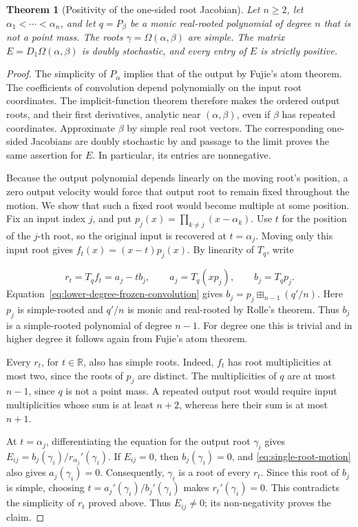\documentclass[12pt,reqno]{amsart}
\newtheorem{theorem}{Theorem}[section]
\theoremstyle{definition}
\theoremstyle{remark}
\newcommand{\R}{\mathbb R}
\begin{document}
\begin{theorem}[Positivity of the one-sided root Jacobian]
\label{thm:positive-one-sided-jacobian}
Let \(n\geq2\), let \(\alpha_1<\cdots<\alpha_n\), and let \(q=P_\beta\)
be a monic real-rooted polynomial of degree \(n\) that is not a point
mass.  The roots \(\gamma=\Omega(\alpha,\beta)\) are simple.  The matrix
\(E=D_1\Omega(\alpha,\beta)\) is doubly stochastic, and every entry of
\(E\) is strictly positive.
\end{theorem}

\begin{proof}
The simplicity of \(P_\alpha\) implies that of the output by Fujie's
atom theorem.  The coefficients of convolution depend polynomially on
the input root coordinates.  The implicit-function theorem therefore makes the ordered output roots, and their first derivatives, analytic near \((\alpha,\beta)\), even if \(\beta\) has repeated coordinates. Approximate \(\beta\) by simple real root vectors. The corresponding one-sided Jacobians are doubly stochastic by \cite[Lemma~3.4]{GVS26} and passage to the limit proves the same assertion for \(E\). In particular, its entries are nonnegative.

Because the output polynomial depends linearly on the moving root’s position, a zero output velocity would force that output root to remain fixed throughout the motion. We show that such a fixed root would become multiple at some position. Fix an input index \(j\), and put \(p_j(x)=\prod_{k\ne j}(x-\alpha_k)\). Use \(t\) for the position of the \(j\)-th root, so the original input is recovered at \(t=\alpha_j\).
Moving only this input root gives \(f_t(x)=(x-t)p_j(x)\).  By linearity of \(T_q\), write 

\begin{equation}\label{eq:single-root-motion}
 r_t=T_qf_t=a_j-tb_j,
 \qquad a_j=T_q(xp_j),\qquad b_j=T_qp_j.
\end{equation}
Equation~\eqref{eq:lower-degree-frozen-convolution} gives \(b_j=p_j\boxplus_{n-1}(q'/n)\).  Here \(p_j\) is simple-rooted and \(q'/n\) is monic and real-rooted by Rolle's theorem.  Thus \(b_j\) is a simple-rooted polynomial of degree \(n-1\).  For degree one this is trivial and in higher degree it follows again from Fujie's atom theorem.

Every \(r_t\), for \(t\in\R\), also has simple roots.  Indeed, \(f_t\) has root multiplicities at most two, since the roots of \(p_j\) are distinct.  The multiplicities of \(q\) are at most \(n-1\), since \(q\) is not a point mass.  A repeated output root would require input multiplicities whose sum is at least \(n+2\), whereas here their sum is at most \(n+1\).

At \(t=\alpha_j\), differentiating the equation for the output root
\(\gamma_i\) gives
\(E_{ij}=b_j(\gamma_i)/r_{\alpha_j}'(\gamma_i)\).
If \(E_{ij}=0\), then \(b_j(\gamma_i)=0\), and
\eqref{eq:single-root-motion} also gives \(a_j(\gamma_i)=0\).
Consequently, \(\gamma_i\) is a root of every \(r_t\).
Since this root of \(b_j\) is simple, choosing
\(t=a_j'(\gamma_i)/b_j'(\gamma_i)\) makes
\(r_t'(\gamma_i)=0\).  This contradicts the simplicity of \(r_t\)
proved above.  Thus \(E_{ij}\ne0\); its non-negativity proves the claim.
\end{proof}
\end{document}
